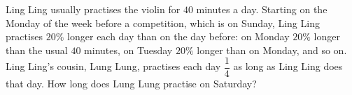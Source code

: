 Ling Ling usually practises the violin for $40$ minutes a day. Starting on the Monday of the week before a competition, which is on Sunday, Ling Ling practises $20\%$ longer each day than on the day before: on Monday $20\%$ longer than the usual $40$ minutes, on Tuesday $20\%$ longer than on Monday, and so on. Ling Ling's cousin, Lung Lung, practises each day $\dfrac14$ as long as Ling Ling does that day. How long does Lung Lung practise on Saturday?
